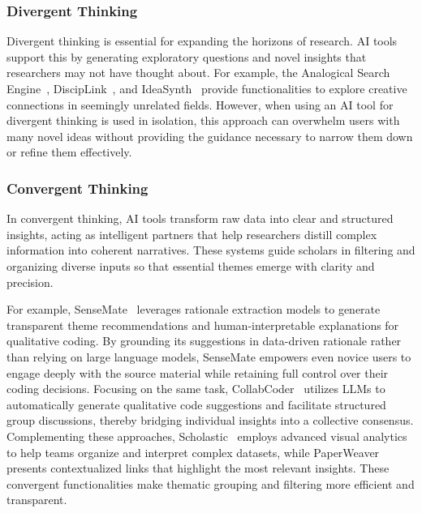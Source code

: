 
\subsubsection{Divergent Thinking}
 Divergent thinking is essential for expanding the horizons of research. AI tools support this by generating exploratory questions and novel insights that researchers may not have thought about. For example, the Analogical Search Engine~\cite{AnalogicalSearchEngine}, DiscipLink~\cite{disciplink}, and IdeaSynth~\cite{IdeaSynth} provide functionalities to explore creative connections in seemingly unrelated fields. However, when using an AI tool for divergent thinking is used in isolation, this approach can overwhelm users with many novel ideas without providing the guidance necessary to narrow them down or refine them effectively.
\subsubsection{Convergent Thinking}
In convergent thinking, AI tools transform raw data into clear and structured insights, acting as intelligent partners that help researchers distill complex information into coherent narratives. These systems guide scholars in filtering and organizing diverse inputs so that essential themes emerge with clarity and precision. 

For example, SenseMate~\cite{sensemate} leverages rationale extraction models to generate transparent theme recommendations and human-interpretable explanations for qualitative coding. By grounding its suggestions in data-driven rationale rather than relying on large language models, SenseMate empowers even novice users to engage deeply with the source material while retaining full control over their coding decisions. Focusing on the same task, CollabCoder~\cite{CollabCoder} utilizes LLMs to automatically generate qualitative code suggestions and facilitate structured group discussions, thereby bridging individual insights into a collective consensus. Complementing these approaches, Scholastic~\cite{scholastic} employs advanced visual analytics to help teams organize and interpret complex datasets, while PaperWeaver~\cite{paperweaver} presents contextualized links that highlight the most relevant insights. These convergent functionalities make thematic grouping and filtering more efficient and transparent. 


